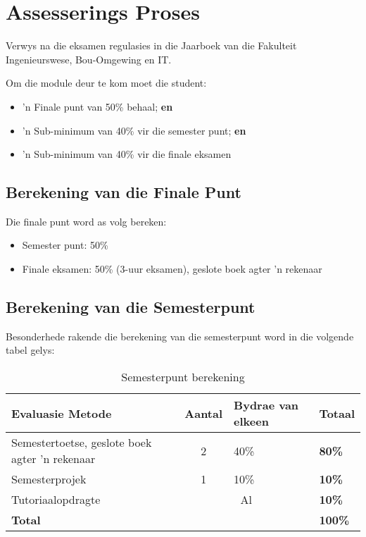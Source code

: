 \section{Assesserings Proses}
    Verwys na die eksamen regulasies in die Jaarboek van die Fakulteit
    Ingenieurswese, Bou-Omgewing en IT.

    Om die module deur te kom moet die student:
    \begin{itemize}
        \item 'n Finale punt van 50\% behaal; {\bf en}
        \item 'n Sub-minimum van 40\% vir die semester punt; {\bf en}
        \item 'n Sub-minimum van 40\% vir die finale eksamen
    \end{itemize}

    \subsection{Berekening van die Finale Punt}
        Die finale punt word as volg bereken:
        \begin{itemize}
            \item Semester punt: 50\%
            \item Finale eksamen: 50\% (3-uur eksamen), geslote boek
              agter 'n rekenaar
        \end{itemize}

    \subsection{Berekening van die Semesterpunt}
        Besonderhede rakende die berekening van die semesterpunt word in die
        volgende tabel gelys:
        \begin{table}[!h]
            \begin{center}
             \begin{tabular}{|p{5cm}|c|l|l|}
               \hline
               {\bf Evaluasie Metode} & {\bf Aantal} &
               {\bf Bydrae van elkeen} & {\bf Totaal} \\
               \hline
               Semestertoetse, geslote boek
               agter 'n rekenaar
               & 2 & 40\% & {\bf 80\%} \\ \hline
               Semesterprojek
               & 1 & 10\% & {\bf 10\%} \\ \hline
               Tutoriaalopdragte
               & \multicolumn{2}{|c|}{Al} & {\bf 10\%} \\
               \hline
               \multicolumn{3}{|l|}{{\bf Total}} & {\bf 100\%} \\
               \hline
             \end{tabular}
             \caption{Semesterpunt berekening}
            \end{center}
        \end{table}

